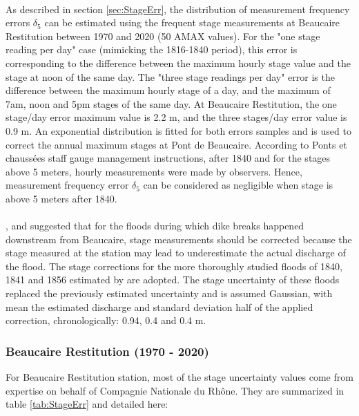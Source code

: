 \documentclass[11pt]{article}
\begin{document}
        \paragraph{}As described in section \ref{sec:StageErr}, the distribution of measurement frequency errors $\delta_5$ can be estimated using the frequent stage measurements at Beaucaire Restitution between 1970 and 2020 (50 AMAX values). For the "one stage reading per day" case (mimicking the 1816-1840 period), this error is corresponding to the difference between the maximum hourly stage value and the stage at noon of the same day. The "three stage readings per day" error is the difference between the maximum hourly stage of a day, and the maximum of 7am, noon and 5pm stages of the same day. At Beaucaire Restitution, the one stage/day error maximum value is 2.2 m, and the three stages/day error value is 0.9 m. An exponential distribution is fitted for both errors samples and is used to correct the annual maximum stages at Pont de Beaucaire. According to Ponts et chaussées staff gauge management instructions, after 1840 and for the stages above 5 meters, hourly measurements were made by observers. Hence, measurement frequency error $\delta_5$ can be considered as negligible when stage is above 5 meters after 1840. 


    \paragraph{}
        \citet{symadrem_programme_2012}, \citet{pichard_hauteurs_2013} and \citet{bard_actualisation_2018} suggested that for the floods during which dike breaks happened downstream from Beaucaire, stage measurements should be corrected because the stage measured at the station may lead to underestimate the actual discharge of the flood. The stage corrections for the more thoroughly studied floods of 1840, 1841 and 1856 estimated by \citet{symadrem_programme_2012} are adopted. The stage uncertainty of these floods replaced the previously estimated uncertainty and is assumed Gaussian, with mean the estimated discharge and standard deviation half of the applied correction, chronologically: 0.94, 0.4 and 0.4 m. 

    \subsubsection{Beaucaire Restitution (1970 - 2020)}
    
    For Beaucaire Restitution station, most of the stage uncertainty values come from \citet{cetiat_conference_2005} expertise on behalf of Compagnie Nationale du Rhône. They are summarized in table \ref{tab:StageErr} and detailed here:
    
\end{document}
